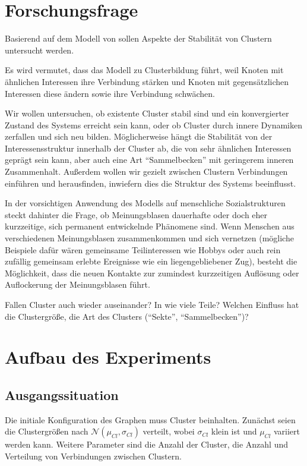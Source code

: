 \documentclass[11pt, a4paper]{scrartcl}
\begin{document}
\section{Forschungsfrage}

Basierend auf dem Modell von \autocite{Koehler-Bussmeier2018} sollen Aspekte der Stabilität von Clustern untersucht werden.

Es wird vermutet, dass das Modell zu Clusterbildung führt, weil Knoten mit ähnlichen Interessen ihre Verbindung stärken und Knoten mit gegensätzlichen Interessen diese ändern sowie ihre Verbindung schwächen.

Wir wollen untersuchen, ob existente Cluster stabil sind und ein konvergierter Zustand des Systems erreicht sein kann, oder ob Cluster durch innere Dynamiken zerfallen und sich neu bilden. Möglicherweise hängt die Stabilität von der Interessensstruktur innerhalb der Cluster ab, die von sehr ähnlichen Interessen geprägt sein kann, aber auch eine Art "`Sammelbecken"' mit geringerem inneren Zusammenhalt. Außerdem wollen wir gezielt zwischen Clustern Verbindungen einführen und herausfinden, inwiefern dies die Struktur des Systems beeinflusst.

In der vorsichtigen Anwendung des Modells auf menschliche Sozialstrukturen steckt dahinter die Frage, ob Meinungsblasen dauerhafte oder doch eher kurzzeitige, sich permanent entwickelnde Phänomene sind. Wenn Menschen aus verschiedenen Meinungsblasen zusammenkommen und sich vernetzen (mögliche Beispiele dafür wären gemeinsame Teilinteressen wie Hobbys oder auch rein zufällig gemeinsam erlebte Ereignisse wie ein liegengebliebener Zug), besteht die Möglichkeit, dass die neuen Kontakte zur zumindest kurzzeitigen Auflösung oder Auflockerung der Meinungsblasen führt.

Fallen Cluster auch wieder auseinander? In wie viele Teile? Welchen Einfluss hat die Clustergröße, die Art des Clusters ("`Sekte"', "`Sammelbecken"')?

\section{Aufbau des Experiments}
\subsection{Ausgangssituation}
Die initiale Konfiguration des Graphen muss Cluster beinhalten. Zunächst seien die Clustergrößen nach $\mathcal{N}\left(\mu_{Cl},\sigma_{Cl}\right)$ verteilt, wobei $\sigma_{Cl}$ klein ist und $\mu_{Cl}$ variiert werden kann. Weitere Parameter sind die Anzahl der Cluster, die Anzahl und Verteilung von Verbindungen zwischen Clustern.
\end{document}
